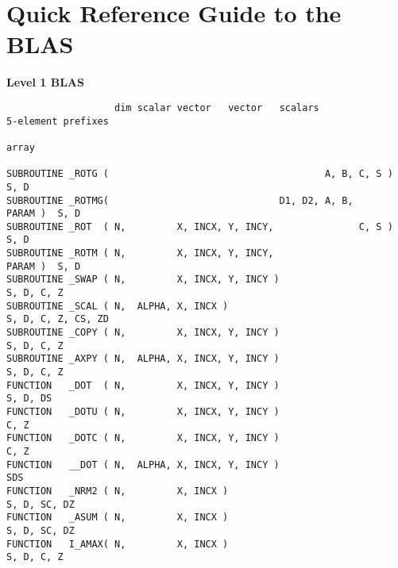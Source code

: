 \chapter{Quick Reference 
Guide to the BLAS}\label{chapqrefblas}

\footnotesize

\newpage
{\bf Level 1 BLAS}
\begin{verbatim}
                   dim scalar vector   vector   scalars              5-element prefixes
                                                                     array

SUBROUTINE _ROTG (                                      A, B, C, S )          S, D
SUBROUTINE _ROTMG(                              D1, D2, A, B,        PARAM )  S, D
SUBROUTINE _ROT  ( N,         X, INCX, Y, INCY,               C, S )          S, D
SUBROUTINE _ROTM ( N,         X, INCX, Y, INCY,                      PARAM )  S, D
SUBROUTINE _SWAP ( N,         X, INCX, Y, INCY )                              S, D, C, Z
SUBROUTINE _SCAL ( N,  ALPHA, X, INCX )                                       S, D, C, Z, CS, ZD
SUBROUTINE _COPY ( N,         X, INCX, Y, INCY )                              S, D, C, Z
SUBROUTINE _AXPY ( N,  ALPHA, X, INCX, Y, INCY )                              S, D, C, Z
FUNCTION   _DOT  ( N,         X, INCX, Y, INCY )                              S, D, DS
FUNCTION   _DOTU ( N,         X, INCX, Y, INCY )                              C, Z
FUNCTION   _DOTC ( N,         X, INCX, Y, INCY )                              C, Z
FUNCTION   __DOT ( N,  ALPHA, X, INCX, Y, INCY )                              SDS
FUNCTION   _NRM2 ( N,         X, INCX )                                       S, D, SC, DZ
FUNCTION   _ASUM ( N,         X, INCX )                                       S, D, SC, DZ
FUNCTION   I_AMAX( N,         X, INCX )                                       S, D, C, Z
\end{verbatim}

\vspace{0.2in}

